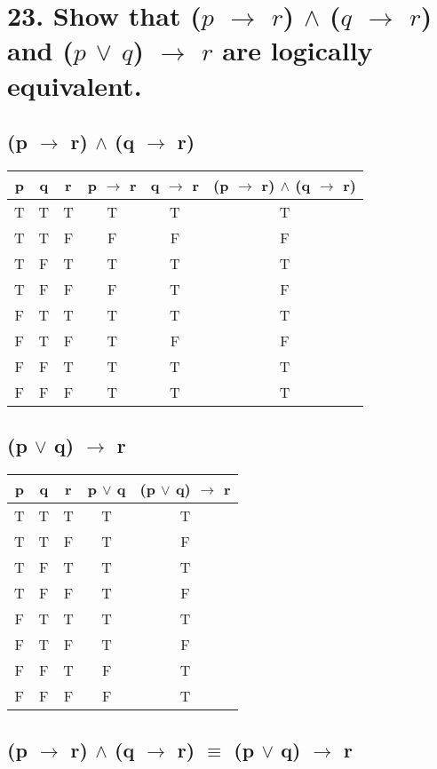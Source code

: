 \documentclass[11pt, oneside]{article} %
\numberwithin{equation}{section} %
\numberwithin{figure}{section} %
\numberwithin{table}{section} %
\begin{document}
\begin{table}[!htp]
\section{23. Show that ($p$ $\rightarrow$ $r$) $\wedge$ ($q$ $\rightarrow$ $r$) and ($p$ $\vee$ $q$) $\rightarrow$ $r$ are logically equivalent.}
\subsection{(p $\rightarrow$ r) $\wedge$ (q $\rightarrow$ r)}
\begin{tabular}{c c c c c c}
\hline\hline
p & q & r & p $\rightarrow$ r & q $\rightarrow$ r & (p $\rightarrow$ r) $\wedge$ (q $\rightarrow$ r)\\ [0.5ex] %
\hline
T & T & T & T & T & T\\
T & T & F & F & F & F\\
T & F & T & T & T & T\\
T & F & F & F & T & F\\
F & T & T & T & T & T\\
F & T & F & T & F & F\\
F & F & T & T & T & T\\
F & F & F & T & T & T\\ [1ex]
\hline
\end{tabular}
\label{table:nonlin}
\end{table}

\begin{table}[!htp]
\subsection{(p $\vee$ q) $\rightarrow$ r}
\begin{tabular}{c c c c c}
\hline\hline
p & q & r & p $\vee$ q & (p $\vee$ q) $\rightarrow$ r \\ [0.5ex] %
\hline
T & T & T & T & T\\
T & T & F & T & F\\
T & F & T & T & T\\
T & F & F & T & F\\
F & T & T & T & T\\
F & T & F & T & F\\
F & F & T & F & T\\
F & F & F & F & T\\ [1ex]
\hline
\end{tabular}
\label{table:nonlin}
\subsection{(p $\rightarrow$ r) $\wedge$ (q $\rightarrow$ r) $\equiv$ (p $\vee$ q) $\rightarrow$ r}
\end{table}
\end{document}
